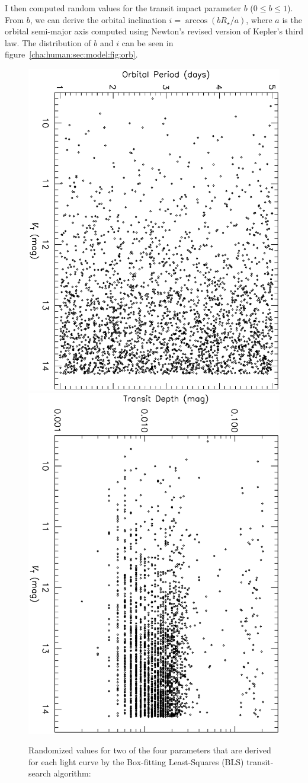 I then computed random values for the transit impact parameter $b$ ($0\leq b\leq 1$).
From $b$, we can derive the orbital inclination $i= \arccos{(b R_{\star}/a)}$, where $a$ is the orbital semi-major axis computed using Newton's revised version of Kepler's third law.
The distribution of $b$ and $i$ can be seen in figure~\ref{cha:human:sec:model:fig:orb}.

\begin{figure}
\begin{center}
\centering
\includegraphics[width=.55\textwidth, angle=90]{7_bls_a}\\
\includegraphics[width=.55\textwidth, angle=90]{7_bls_b}\\
\caption[Randomized values for first two BLS parameters]{%
Randomized values for two of the four parameters that are derived for each light curve by the Box-fitting Least-Squares (BLS) transit-search algorithm: %
}
\end{center}
\end{figure}
